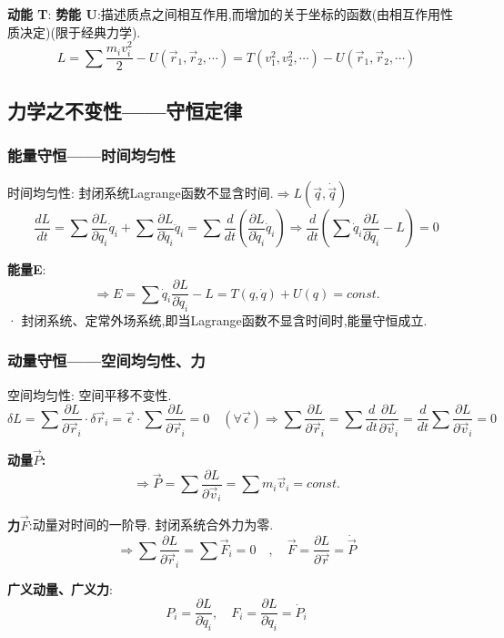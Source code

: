 \documentclass{article}
\begin{document}
        \textbf{动能 T}: \quad \textbf{势能 U}:描述质点之间相互作用,而增加的关于坐标的函数(由相互作用性质决定)(限于经典力学).
            $$L = \sum \frac{m_i v_i^2}{2} - U(\vec r_1,\vec r_2,\cdots ) = T(v_1^2,v_2^2,\cdots) - U(\vec r_1,\vec r_2,\cdots )$$


\subsection{力学之不变性——守恒定律}
    \subsubsection{能量守恒——时间均匀性}
        时间均匀性: 封闭系统Lagrange函数不显含时间.\quad $\Rightarrow L(\vec q,\dot \vec q)$
            $$\frac{dL}{dt} = \sum \frac{\partial L}{\partial q_i} \dot q_i + \sum \frac{\partial L}{\partial \dot q_i} \ddot q_i = \sum \frac{d}{dt}(\frac{\partial L}{\partial \dot q_i}\dot q_i) 
            \Rightarrow \frac{d}{dt}(\sum \dot q_i \frac{\partial L}{\partial \dot q_i} - L) = 0$$
            
        \textbf{能量E}: 
        $$\Rightarrow E = \sum \dot q_i \frac{\partial L}{\partial \dot q_i} - L  = T(q,\dot q) + U(q) = const.$$
    · 封闭系统、定常外场系统,即当Lagrange函数不显含时间时,能量守恒成立.


    \subsubsection{动量守恒——空间均匀性、力}
        空间均匀性: 空间平移不变性.
            $$\delta L = \sum \frac{\partial L}{\partial \vec r_i}\cdot \delta \vec r_i = \vec \epsilon \cdot \sum \frac{\partial L}{\partial \vec r_i} = 0\quad(\forall \vec \epsilon)
            \Rightarrow \sum \frac{\partial L}{\partial \vec r_i} = \sum \frac{d}{dt} \frac{\partial L}{\partial \vec v_i} = \frac{d}{dt} \sum \frac{\partial L}{\partial \vec v_i} = 0$$
    
        \textbf{动量$\vec P$: }
            $$\Rightarrow \vec P = \sum \frac{\partial L}{\partial \vec v_i} = \sum m_i \vec v_i = const.$$
    
        \textbf{力$\vec F$}:动量对时间的一阶导. \quad 封闭系统合外力为零.
            $$\Rightarrow \sum \frac{\partial L}{\partial \vec r_i} = \sum \vec F_i = 0 \quad , \quad \vec F = \frac{\partial L}{\partial \vec r} = \dot{ \vec P }$$
    
        \textbf{广义动量、广义力}:
            $$P_i = \frac{\partial L}{\partial \dot q_i},\quad F_i = \frac{\partial L}{\partial \dot q_i} = \dot P_i$$
\end{document}
